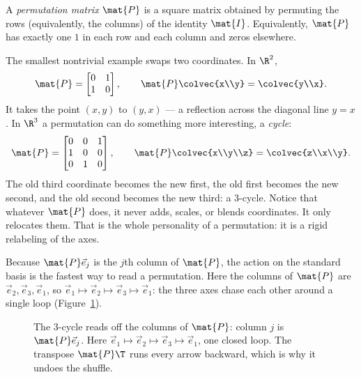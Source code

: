 \begin{definition}\label{ch10:def-perm}
A \emph{permutation matrix} $\mat{P}$ is a square matrix obtained by permuting the rows (equivalently,
the columns) of the identity $\mat{I}$. Equivalently, $\mat{P}$ has exactly one $1$ in each row and
each column and zeros elsewhere.
\end{definition}

The smallest nontrivial example swaps two coordinates. In $\R^2$,
\[
  \mat{P}=\begin{bmatrix} 0 & 1 \\ 1 & 0 \end{bmatrix},
  \qquad
  \mat{P}\colvec{x\\y}=\colvec{y\\x}.
\]
It takes the point $(x,y)$ to $(y,x)$ --- a reflection across the diagonal line $y=x$. In $\R^3$ a
permutation can do something more interesting, a \emph{cycle}:
\[
  \mat{P}=\begin{bmatrix} 0 & 0 & 1 \\ 1 & 0 & 0 \\ 0 & 1 & 0 \end{bmatrix},
  \qquad
  \mat{P}\colvec{x\\y\\z}=\colvec{z\\x\\y}.
\]
The old third coordinate becomes the new first, the old first becomes the new second, and the old
second becomes the new third: a $3$-cycle. Notice that whatever $\mat{P}$ does, it never adds,
scales, or blends coordinates. It only relocates them. That is the whole personality of a
permutation: it is a rigid relabeling of the axes.

Because $\mat{P}\vec{e}_j$ is the $j$th column of $\mat{P}$, the action on the standard basis is the
fastest way to read a permutation. Here the columns of $\mat{P}$ are $\vec{e}_2,\vec{e}_3,\vec{e}_1$,
so $\vec{e}_1\mapsto\vec{e}_2\mapsto\vec{e}_3\mapsto\vec{e}_1$: the three axes chase each other around
a single loop (Figure~\ref{ch10:fig-cycle}).

\begin{figure}[H]
\centering
{}
\caption{The $3$-cycle reads off the columns of $\mat{P}$: column $j$ is $\mat{P}\vec{e}_j$. Here
$\vec{e}_1\mapsto\vec{e}_2\mapsto\vec{e}_3\mapsto\vec{e}_1$, one closed loop. The transpose
$\mat{P}\T$ runs every arrow backward, which is why it undoes the shuffle.}
\label{ch10:fig-cycle}
\end{figure}

